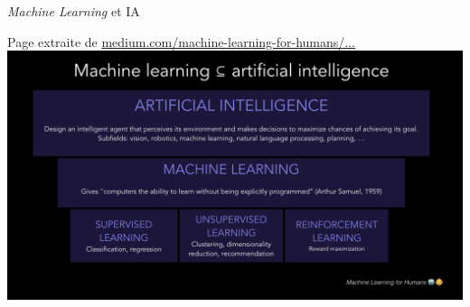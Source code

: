 \documentclass[10pt,serif,mathserif,compress,hyperref={colorlinks}]{beamer}
\begin{document}
\begin{frame}{{\em Machine Learning} et IA}

  {\small Page extraite de \href{https://medium.com/machine-learning-for-humans/why-machine-learning-matters-6164faf1df12}
  {medium.com/machine-learning-for-humans/...}}\\[2mm]
  
  \hspace*{-10mm}\includegraphics[width=1.2\textwidth]{images/AI-from_MachineLearningForHumans.png}
  \vspace*{-8mm}
  
\end{frame}
\end{document}

